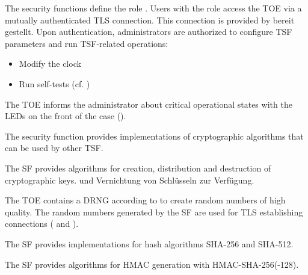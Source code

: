 

The security functions define the role . Users with the
role  access the TOE via a mutually authenticated TLS
connection. This connection is provided by
 bereit gestellt. Upon authentication, administrators are authorized to configure TSF parameters and run TSF-related operations:

\begin{itemize}
\item Modify the clock
\item Run self-tests (cf. )
\end{itemize}

The TOE informs the administrator about critical operational states with the
LEDs on the front of the case ().



The security function  provides
implementations of cryptographic algorithms that can be used by other TSF.


The SF provides algorithms for creation, distribution and destruction of
cryptographic keys.  und Vernichtung von Schlüsseln zur Verfügung.



The TOE contains a DRNG according to  to create
random numbers of high quality. The random numbers generated by the SF are used
for TLS establishing connections ( and
).



The SF provides implementations for hash algorithms SHA-256 and SHA-512.



The SF provides algorithms for HMAC generation with HMAC-SHA-256(-128).


